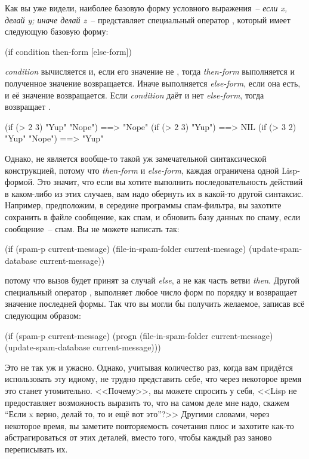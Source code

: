 Как вы уже видели, наиболее базовую форму условного выражения~-- \textit{если x, делай y;
  иначе делай z}~-- представляет специальный оператор , который имеет следующую
базовую форму:

\begin{myverb}
(if condition then-form [else-form])
\end{myverb}

\textit{condition} вычисляется и, если его значение не , тогда
\textit{then-form} выполняется и полученное значение возвращается. Иначе выполняется
\textit{else-form}, если она есть, и её значение возвращается. Если \textit{condition}
даёт  и нет \textit{else-form}, тогда  возвращает .

\begin{myverb}
(if (> 2 3) "Yup" "Nope") ==> "Nope"
(if (> 2 3) "Yup")        ==> NIL
(if (> 3 2) "Yup" "Nope") ==> "Yup"
\end{myverb}

Однако,  не является вообще-то такой уж замечательной синтаксической
конструкцией, потому что \textit{then-form} и \textit{else-form}, каждая ограничена одной
Lisp-формой. Это значит, что если вы хотите выполнить последовательность действий в
каком-либо из этих случаев, вам надо обернуть их в какой-то другой синтаксис. Например,
предположим, в середине программы спам-фильтра, вы захотите сохранить в файле сообщение,
как спам, и обновить базу данных по спаму, если сообщение~-- спам. Вы не можете написать
так:

\begin{myverb}
(if (spam-p current-message)
    (file-in-spam-folder current-message)
    (update-spam-database current-message))
\end{myverb}

потому что вызов  будет принят за случай \textit{else}, а не
как часть ветви \textit{then}. Другой специальный оператор , выполняет любое
число форм по порядку и возвращает значение последней формы. Так что вы могли бы получить
желаемое, записав всё следующим образом:

\begin{myverb}
(if (spam-p current-message)
    (progn
      (file-in-spam-folder current-message)
      (update-spam-database current-message)))
\end{myverb}

Это не так уж и ужасно. Однако, учитывая количество раз, когда вам придётся использовать
эту идиому, не трудно представить себе, что через некоторое время это станет
утомительно. <<Почему>>, вы можете спросить у себя, <<Lisp не предоставляет возможность
выразить то, что на самом деле мне надо, скажем ``Если x верно, делай то, то и ещё вот
это''?>> Другими словами, через некоторое время, вы заметите повторяемость сочетания
 плюс  и захотите как-то абстрагироваться от этих деталей, вместо
того, чтобы каждый раз заново переписывать их.

